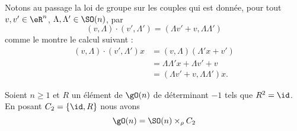 \begin{remark}      \label{REMooLUEZooIwvTqu}
	Notons au passage la loi de groupe sur les couples qui est donnée, pour tout \( v,v'\in \eR^n\), \( \Lambda,\Lambda'\in\SO(n)\), par
	\begin{equation}    \label{EqDiHcut}
		(v,\Lambda)\cdot(v',\Lambda')=(\Lambda v'+v,\Lambda\Lambda')
	\end{equation}
	comme le montre le calcul suivant :
	\begin{subequations}
		\begin{align}
			(v,\Lambda)\cdot(v',\Lambda')x & =(v,\Lambda)(\Lambda'x+v')        \\
			                               & =\Lambda\Lambda'x+\Lambda v'+v    \\
			                               & =(\Lambda v'+v,\Lambda\Lambda')x.
		\end{align}
	\end{subequations}
\end{remark}

\begin{proposition}      \label{PROPooDHYWooXxEXvl}
	Soient \( n\geq 1\) et \( R\) un élément de \( \gO(n)\) de déterminant \( -1\) tels que \( R^2=\id\). En posant \( C_2=\{ \id,R \}\) nous avons
	\begin{equation}
		\gO(n)=\SO(n)\times_{\rho} C_2
	\end{equation}
\end{proposition}


